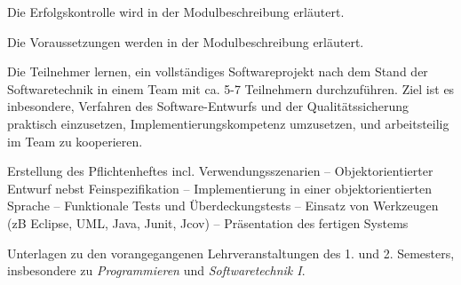 \begin{course}

\setdoclanguagegerman
{}



\coursehead


\label{cour_8211.dp_997}


\begin{styleenv}
\begin{assessment}
Die Erfolgskontrolle wird in der Modulbeschreibung erläutert.


\end{assessment}

\begin{conditions}Die Voraussetzungen werden in der Modulbeschreibung erläutert.

\end{conditions}


\end{styleenv}

\begin{learningoutcomes}
Die Teilnehmer lernen, ein vollständiges Softwareprojekt nach dem Stand der Softwaretechnik in einem Team mit ca. 5-7 Teilnehmern durchzuführen. Ziel ist es inbesondere, Verfahren des Software-Entwurfs und der Qualitätssicherung praktisch einzusetzen, Implementierungskompetenz umzusetzen, und arbeitsteilig im Team zu kooperieren.


\end{learningoutcomes}

\begin{content}
Erstellung des Pflichtenheftes incl. Verwendungsszenarien – Objektorientierter Entwurf nebst Feinspezifikation – Implementierung in einer objektorientierten Sprache – Funktionale Tests und Überdeckungstests – Einsatz von Werkzeugen (zB Eclipse, UML, Java, Junit, Jcov) – Präsentation des fertigen Systems


\end{content}

\begin{media}Unterlagen zu den vorangegangenen Lehrveranstaltungen des 1. und 2. Semesters, insbesondere zu \emph{Programmieren} und \emph{Softwaretechnik I}.

\end{media}





\end{course}